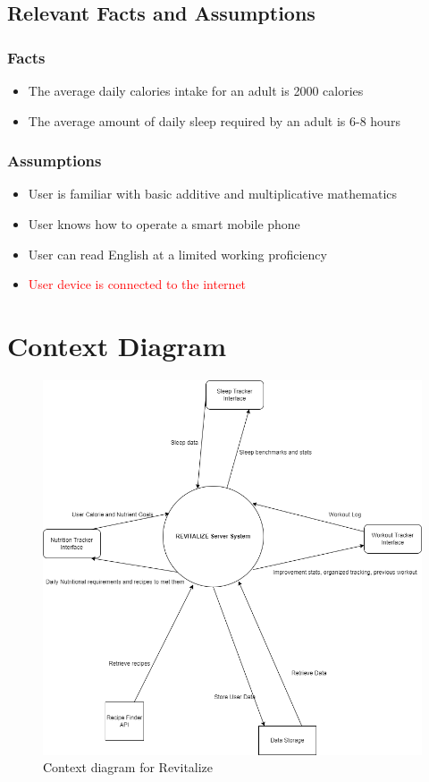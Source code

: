 \documentclass[12pt,letterpaper]{article}
\begin{document}
\subsection{Relevant Facts and Assumptions}
\subsubsection{Facts}
\begin{itemize}
	\item The average daily calories intake for an adult is 2000 calories
	\item The average amount of daily sleep required by an adult is 6-8 hours
\end{itemize}

\subsubsection{Assumptions}
\begin{itemize}
	\item User is familiar with basic additive and multiplicative mathematics
	\item User knows how to operate a smart mobile phone
	\item User can read English at a limited working proficiency
	\item {\textcolor{red}{User device is connected to the internet}}
\end{itemize}
\section{Context Diagram}
\begin{figure}[H]
	\centering
	\includegraphics[scale=0.5]{cont_diag.png}
	\caption{\textcolor{black} Context diagram for Revitalize}
\end{figure}
\end{document}
